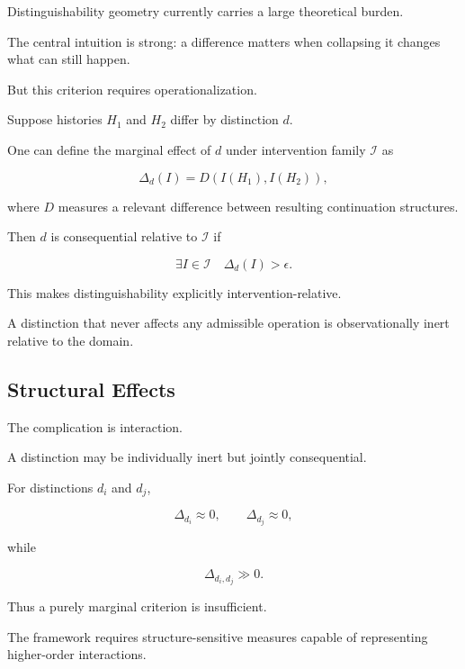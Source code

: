 \documentclass[11pt]{article}
\theoremstyle{remark}
\begin{document}
Distinguishability geometry currently carries a large theoretical burden.

The central intuition is strong: a difference matters when collapsing it changes what can still happen.

But this criterion requires operationalization.

Suppose histories $H_1$ and $H_2$ differ by distinction $d$.

One can define the marginal effect of $d$ under intervention family $\mathcal{I}$ as

\begin{equation}
\Delta_d(I)
=
D
\left(
I(H_1),
I(H_2)
\right),
\end{equation}

where $D$ measures a relevant difference between resulting continuation structures.

Then $d$ is consequential relative to $\mathcal{I}$ if

\begin{equation}
\exists I\in\mathcal{I}
\quad
\Delta_d(I)>\epsilon.
\end{equation}

This makes distinguishability explicitly intervention-relative.

A distinction that never affects any admissible operation is observationally inert relative to the domain.

\subsection{Structural Effects}

The complication is interaction.

A distinction may be individually inert but jointly consequential.

For distinctions $d_i$ and $d_j$,

\begin{equation}
\Delta_{d_i}\approx 0,
\qquad
\Delta_{d_j}\approx 0,
\end{equation}

while

\begin{equation}
\Delta_{d_i,d_j}\gg 0.
\end{equation}

Thus a purely marginal criterion is insufficient.

The framework requires structure-sensitive measures capable of representing higher-order interactions.
\end{document}
